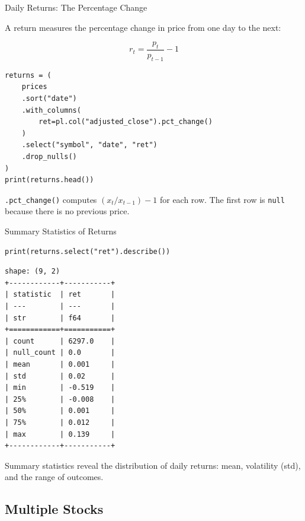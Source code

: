 \documentclass[9pt,aspectratio=169]{beamer}
\begin{document}
\begin{frame}[fragile]{Daily Returns: The Percentage Change}

A \alert{return} measures the percentage change in price from one day to the next:

$$r_t = \frac{p_t}{p_{t-1}} - 1$$

\begin{lstlisting}
returns = (
    prices
    .sort("date")
    .with_columns(
        ret=pl.col("adjusted_close").pct_change()
    )
    .select("symbol", "date", "ret")
    .drop_nulls()
)
print(returns.head())
\end{lstlisting}

\medskip

\begin{highlightbox}
\centering
\texttt{.pct\_change()} computes $(x_t / x_{t-1}) - 1$ for each row. The first row is \texttt{null} because there is no previous price.
\end{highlightbox}

\end{frame}


\begin{frame}[fragile]{Summary Statistics of Returns}

\begin{lstlisting}
print(returns.select("ret").describe())
\end{lstlisting}

\begin{lstlisting}[style=output]
shape: (9, 2)
+------------+-----------+
| statistic  | ret       |
| ---        | ---       |
| str        | f64       |
+============+===========+
| count      | 6297.0    |
| null_count | 0.0       |
| mean       | 0.001     |
| std        | 0.02      |
| min        | -0.519    |
| 25%        | -0.008    |
| 50%        | 0.001     |
| 75%        | 0.012     |
| max        | 0.139     |
+------------+-----------+
\end{lstlisting}

Summary statistics reveal the distribution of daily returns: mean, volatility (std), and the range of outcomes.

\end{frame}


\subsection{Multiple Stocks}
\end{document}
